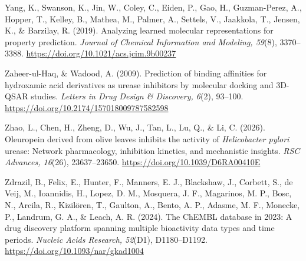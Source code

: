 \documentclass[11pt]{article}
\begin{document}
Yang, K., Swanson, K., Jin, W., Coley, C., Eiden, P., Gao, H., Guzman-Perez, A., Hopper, T., Kelley, B., Mathea, M., Palmer, A., Settels, V., Jaakkola, T., Jensen, K., \& Barzilay, R. (2019). Analyzing learned molecular representations for property prediction. \textit{Journal of Chemical Information and Modeling, 59}(8), 3370--3388. \url{https://doi.org/10.1021/acs.jcim.9b00237}

Zaheer-ul-Haq, \& Wadood, A. (2009). Prediction of binding affinities for hydroxamic acid derivatives as urease inhibitors by molecular docking and 3D-QSAR studies. \textit{Letters in Drug Design \& Discovery, 6}(2), 93--100. \url{https://doi.org/10.2174/157018009787582598}

Zhao, L., Chen, H., Zheng, D., Wu, J., Tan, L., Lu, Q., \& Li, C. (2026). Oleuropein derived from olive leaves inhibits the activity of \textit{Helicobacter pylori} urease: Network pharmacology, inhibition kinetics, and mechanistic insights. \textit{RSC Advances, 16}(26), 23637--23650. \url{https://doi.org/10.1039/D6RA00410E}

Zdrazil, B., Felix, E., Hunter, F., Manners, E. J., Blackshaw, J., Corbett, S., de Veij, M., Ioannidis, H., Lopez, D. M., Mosquera, J. F., Magarinos, M. P., Bosc, N., Arcila, R., Kizilören, T., Gaulton, A., Bento, A. P., Adasme, M. F., Monecke, P., Landrum, G. A., \& Leach, A. R. (2024). The ChEMBL database in 2023: A drug discovery platform spanning multiple bioactivity data types and time periods. \textit{Nucleic Acids Research, 52}(D1), D1180--D1192. \url{https://doi.org/10.1093/nar/gkad1004}
\end{document}

